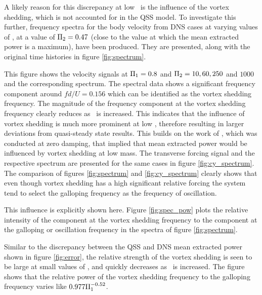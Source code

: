 

A likely reason for this discrepancy at low \massstiff\ is the influence of the vortex shedding, which is not accounted for in the QSS model. To investigate this further, frequency spectra for the body velocity from DNS cases at varying values of \massstiff, at a value of $\Pi_2=0.47$ (close to the value at which the mean extracted power is a maximum), have been produced. They are presented, along with the original time histories in figure \ref{fig:spectrum}.





This figure shows the  velocity signals at $\Pi_1=0.8$ and $\Pi_2= 10, 60, 250$ and $1000$ and the corresponding spectrum. The spectral data shows a significant frequency component around $fd/U=0.156$ which can be identified as the vortex shedding frequency. The magnitude of the frequency component at the vortex shedding frequency clearly reduces as \massstiff\ is increased. This indicates that the influence of vortex shedding is much more prominent at low \massstiff,  therefore resulting in larger deviations from quasi-steady state results. This builds on the work of \cite{Joly2012}, which was conducted at zero damping, that implied that mean extracted power would be influenced by vortex shedding at low mass. The transverse forcing signal and the respective spectrum are presented for the same cases in figure \ref{fig:cy_spectrum}. The comparison of figures \ref{fig:spectrum} and \ref{fig:cy_spectrum} clearly shows that even though vortex shedding has a high significant relative forcing the system tend to select the galloping frequency as the frequency of oscillation.

This influence is explicitly shown here. Figure \ref{fig:spec_pow} plots the relative intensity of the component at the vortex shedding frequency to the component at the galloping or oscillation frequency in the spectra of figure \ref{fig:spectrum}.




Similar to the discrepancy between the QSS and DNS mean extracted power shown in figure \ref{fig:error}, the relative strength of the vortex shedding is seen to be large at small values of \massstiff, and quickly decreases as \massstiff\ is increased. The figure shows that the relative power of the vortex shedding frequency to the galloping frequency varies like $0.977\Pi_1^{-0.52}$.

